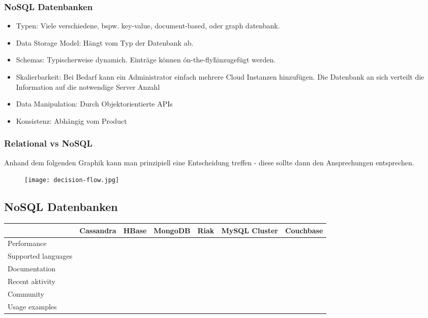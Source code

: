 		\subsubsection{NoSQL Datenbanken}
			\begin{itemize}
				\item Typen: Viele verschiedene, bspw. key-value, document-based, oder graph datenbank.
				\item Data Storage Model: Hängt vom Typ der Datenbank ab.
				\item Schemas: Typischerweise dynamich. Einträge können \'on-the-fly\' hinzugefügt werden.
				\item Skalierbarkeit: Bei Bedarf kann ein Administrator einfach mehrere Cloud Instanzen hinzufügen. Die Datenbank an sich verteilt die Information auf die notwendige Server Anzahl
				\item Data Manipulation: Durch Objektorientierte APIs
				\item Konsistenz: Abhängig vom Product
			\end{itemize}

		\newpage
		\vfill
		\subsubsection{Relational vs NoSQL}
		Anhand dem folgenden Graphik kann man prinzipiell eine Entscheidung treffen - diese sollte dann den Ansprechungen entsprechen.
		 
		\begin{figure}[h!]
			\texttt{[image: decision-flow.jpg]}
			\centering
		\end{figure}
		\newpage
		\vfill

	\subsection{NoSQL Datenbanken}

		\begin{tabular} {| l | c | c | c | c | c | c |}
			\hline
			& Cassandra & HBase & MongoDB & Riak & MySQL Cluster & Couchbase		\\ \hline \hline
			Performance &  &	 &  &  &  &  &		\\ \hline
			Supported languages &  &	 &  &  &  &  &	 			\\ \hline
			Documentation &  &	 &  &  &  &  &	 		\\ \hline
			Recent aktivity &  &	 &  &  &  &  &			\\ \hline
			Community &  &  &  &  &  &  &		\\ \hline 
			Usage examples	&  &	&  &  &  &  &					\\ \hline
		\end{tabular}

